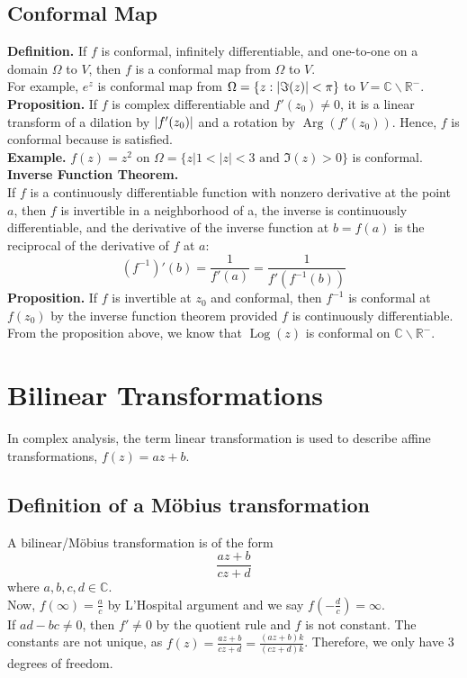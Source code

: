 \documentclass[11pt]{article}
\newcommand*\circled[1]{\tikz[baseline=(char.base)]{
            \node[shape=circle,draw,inner sep=2pt] (char) {#1};}}
\DeclarePairedDelimiter\abs{\lvert}{\rvert}
\begin{document}
\subsection{Conformal Map} 

\textbf{Definition.} If $f$ is conformal, infinitely differentiable, and one-to-one on a domain $\Omega$ to $V$, then $f$ is a conformal map from $\Omega$ to $V$. \\
For example, $e^z$ is conformal map from $\Omega = \{z:\abs{\Im(z)} < \pi \}$ to $V = \mathbb{C} \backslash \mathbb{R}^-$. \\
\textbf{Proposition.} If $f$ is complex differentiable and $f'(z_0) \neq 0$, it is a linear transform of a dilation by $\abs{f'(z_0)}$ and a rotation by $\operatorname{Arg}(f'(z_0))$. Hence, $f$ is conformal because \circled{3} is satisfied. \\
\textbf{Example.} $f(z) = z^2$ on $\Omega = \{z| 1< |z| < 3 \mbox{ and } \Im(z) > 0 \}$ is conformal. \\
\newline
\textbf{Inverse Function Theorem.} \\ 
If $f$ is a continuously differentiable function with nonzero derivative at the point $a$, then $f$ is invertible in a neighborhood of a, the inverse is continuously differentiable, and the derivative of the inverse function at $b=f(a)$ is the reciprocal of the derivative of $f$ at $a$: 
$$(f^{-1})'(b) = \frac{1}{f'(a)} = \frac{1}{f'(f^{-1}(b))}$$
\textbf{Proposition.} If $f$ is invertible at $z_0$ and conformal, then $f^{-1}$ is conformal at $f(z_0)$ by the inverse function theorem provided $f$ is continuously differentiable. \\
\newline 
From the proposition above, we know that $\operatorname{Log}(z)$ is conformal on $\mathbb{C} \backslash \mathbb{R}^-$.

\newpage
\section{Bilinear Transformations}
In complex analysis, the term linear transformation is used to describe affine transformations, $f(z) = az + b$. \\
\subsection{Definition of a Möbius transformation}
A bilinear/Möbius transformation is of the form 
$$\frac{az + b}{cz + d}$$
where $a, b, c, d \in \mathbb{C}$. \\
Now, $f(\infty) = \frac{a}{c}$ by L'Hospital argument and we say $f(-\frac{d}{c}) = \infty$. \\
If $ad - bc \neq 0$, then $f' \neq 0$ by the quotient rule and $f$ is not constant. The constants are not unique, as $f(z) = \frac{az + b}{cz + d} = \frac{(az+b)k}{(cz + d)k}$. Therefore, we only have 3 degrees of freedom. \\
\end{document}
